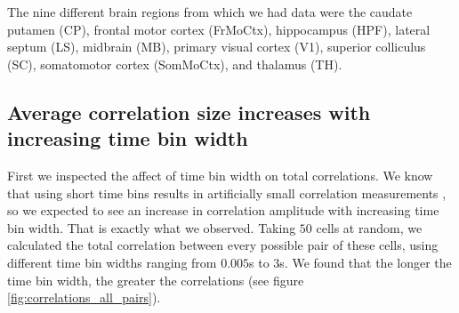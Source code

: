 The nine different brain regions from which we had data were the caudate putamen (CP), frontal motor cortex (FrMoCtx), hippocampus (HPF), lateral septum (LS), midbrain (MB), primary visual cortex (V1), superior colliculus (SC), somatomotor cortex (SomMoCtx), and thalamus (TH).

    \subsection{Average correlation size increases with increasing time bin width}
    First we inspected the affect of time bin width on total correlations. We know that using short time bins results in artificially small correlation measurements \parencite{cohen2}, so we expected to see an increase in correlation amplitude with increasing time bin width. That is exactly what we observed. Taking $50$ cells at random, we calculated the total correlation between every possible pair of these cells, using different time bin widths ranging from $0.005$s to $3$s. We found that the longer the time bin width, the greater the correlations (see figure \ref{fig:correlations_all_pairs}).

